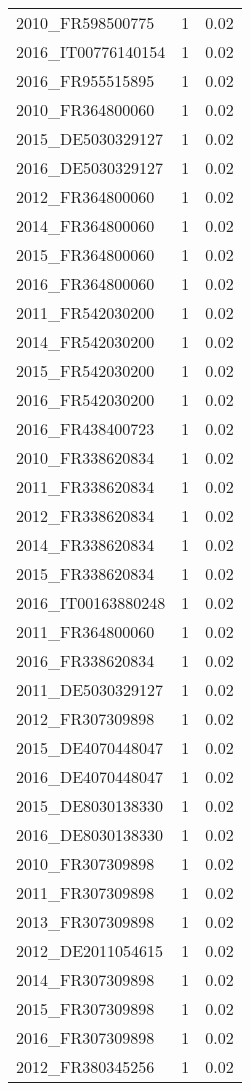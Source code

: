\begin{table*}[htbp]
\begin{tabular}{lrr}
2010_FR598500775 & 1 & 0.02 \\
2016_IT00776140154 & 1 & 0.02 \\
2016_FR955515895 & 1 & 0.02 \\
2010_FR364800060 & 1 & 0.02 \\
2015_DE5030329127 & 1 & 0.02 \\
2016_DE5030329127 & 1 & 0.02 \\
2012_FR364800060 & 1 & 0.02 \\
2014_FR364800060 & 1 & 0.02 \\
2015_FR364800060 & 1 & 0.02 \\
2016_FR364800060 & 1 & 0.02 \\
2011_FR542030200 & 1 & 0.02 \\
2014_FR542030200 & 1 & 0.02 \\
2015_FR542030200 & 1 & 0.02 \\
2016_FR542030200 & 1 & 0.02 \\
2016_FR438400723 & 1 & 0.02 \\
2010_FR338620834 & 1 & 0.02 \\
2011_FR338620834 & 1 & 0.02 \\
2012_FR338620834 & 1 & 0.02 \\
2014_FR338620834 & 1 & 0.02 \\
2015_FR338620834 & 1 & 0.02 \\
2016_IT00163880248 & 1 & 0.02 \\
2011_FR364800060 & 1 & 0.02 \\
2016_FR338620834 & 1 & 0.02 \\
2011_DE5030329127 & 1 & 0.02 \\
2012_FR307309898 & 1 & 0.02 \\
2015_DE4070448047 & 1 & 0.02 \\
2016_DE4070448047 & 1 & 0.02 \\
2015_DE8030138330 & 1 & 0.02 \\
2016_DE8030138330 & 1 & 0.02 \\
2010_FR307309898 & 1 & 0.02 \\
2011_FR307309898 & 1 & 0.02 \\
2013_FR307309898 & 1 & 0.02 \\
2012_DE2011054615 & 1 & 0.02 \\
2014_FR307309898 & 1 & 0.02 \\
2015_FR307309898 & 1 & 0.02 \\
2016_FR307309898 & 1 & 0.02 \\
2012_FR380345256 & 1 & 0.02 \\

\end{tabular}
\end{table*}
